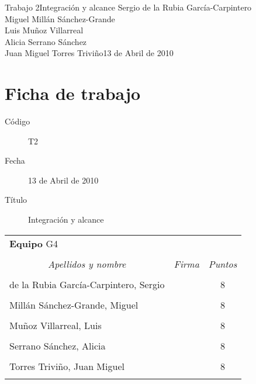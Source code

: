 \documentclass[11pt,a4paper,spanish,twoside]{report}
\begin{document}


{Trabajo 2}{Integración y alcance}
{Sergio de la Rubia García-Carpintero\\Miguel Millán Sánchez-Grande\\
  Luis Muñoz Villarreal\\Alicia Serrano Sánchez\\
  Juan Miguel Torres Triviño}{13 de Abril de 2010}


\chapter*{Ficha de trabajo}
\begin{description}
\item[Código] T2
\item[Fecha] 13 de Abril de 2010
\item[Título] Integración y alcance
\end{description}

\begin{table}[!ht]
  \centering
  \begin{tabular}{lp{5cm}c}
    \multicolumn{3}{l}{\Large \textbf{Equipo} G4} \\ \\
    \multicolumn{1}{c}{\emph{Apellidos y nombre}} & 
    \multicolumn{1}{c}{\emph{Firma}} & \emph{Puntos} \\
    \hline \\
    de la Rubia García-Carpintero, Sergio & & 8 \\ \\
    Millán Sánchez-Grande, Miguel         & & 8 \\ \\
    Muñoz Villarreal, Luis                & & 8 \\ \\
    Serrano Sánchez, Alicia               & & 8 \\ \\
    Torres Triviño, Juan Miguel           & & 8 \\ \\
    \hline
  \end{tabular}
\end{table}
\end{document}
